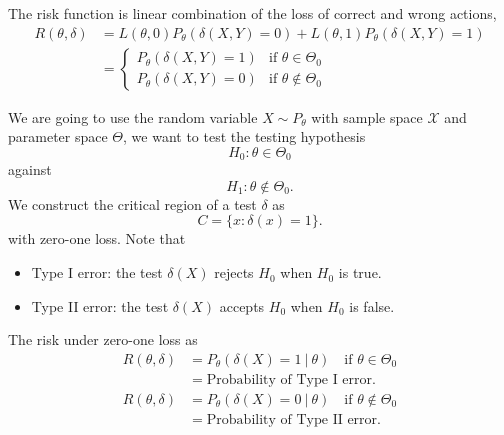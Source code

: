 \begin{example}
    The risk function is linear combination of the loss of correct and wrong actions,
    \begin{align*}
        R(\theta, \delta) &= L(\theta, 0)P_\theta \left(\delta(X,Y) = 0 \right) +
        L(\theta, 1)P_\theta \left(\delta(X,Y) = 1 \right)\\
        &= \begin{cases}
            P_\theta \left(\delta(X,Y) = 1 \right) & \text{if } \theta \in \Theta_0\\
            P_\theta \left(\delta(X,Y) = 0 \right) & \text{if } \theta \notin \Theta_0
        \end{cases}
    \end{align*}
\end{example}

\begin{example}
    We are going to use the random variable $X \sim P_\theta$ with sample space $\mathcal{X}$ and 
    parameter space $\Theta$, we want to test the testing hypothesis
    \[
        H_0 : \theta \in \Theta_0
    \]
    against 
    \[
        H_1 : \theta \notin \Theta_0.
    \]
    We construct the critical region of a test $\delta$ as  
    \[
        C = \{ x : \delta(x) = 1 \}.
    \]
    with zero-one loss. Note that 
    \begin{itemize}
        \item Type I error: the test $\delta(X)$ rejects $H_0$ when $H_0$ is true.
        \item Type II error: the test $\delta(X)$ accepts $H_0$ when $H_0$ is false.
    \end{itemize}
    
    The risk under zero-one loss as 
    \begin{align*}
        R(\theta, \delta) &= P_\theta (\delta(X) = 1 \> | \> \theta) \quad \text{if } \theta \in \Theta_0\\
        &= \text{Probability of Type I error}.
    \end{align*}
    \begin{align*}
        R(\theta, \delta) &= P_\theta (\delta(X) = 0 \> | \> \theta) \quad \text{if } \theta \notin \Theta_0\\
        &= \text{Probability of Type II error}.
    \end{align*}
\end{example}

